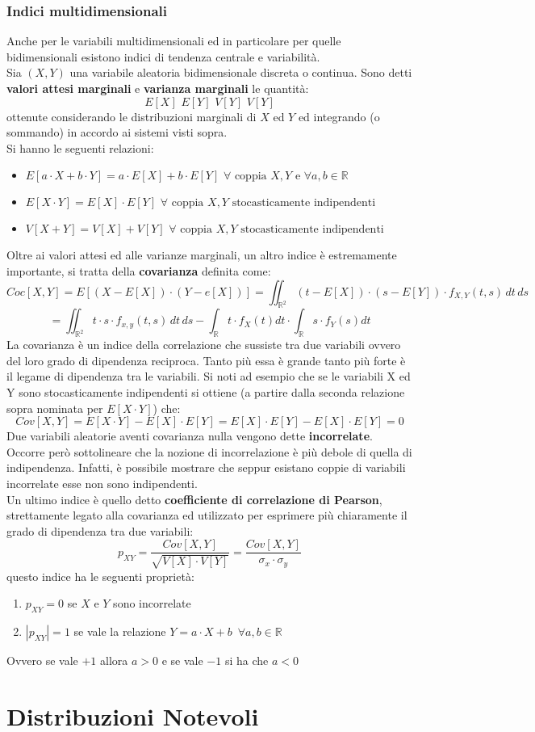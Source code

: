 \documentclass[a4paper,12pt, oneside]{book}
\begin{document}
\subsection{Indici multidimensionali}
Anche per le variabili multidimensionali ed in particolare per quelle bidimensionali esistono indici di tendenza centrale e variabilità.\\
Sia $(X,Y)$ una variabile aleatoria bidimensionale discreta o continua. Sono detti \textbf{valori attesi marginali} e \textbf{varianza marginali }le quantità:
\[E[X]\,\,E[Y]\,\,V[Y]\,\,V[Y]\]
ottenute considerando le distribuzioni marginali di $X$ ed $Y $ ed integrando (o sommando) in accordo ai sistemi visti sopra.\\
Si hanno le seguenti relazioni:
\begin{itemize}
\item $E[a\cdot X +b \cdot Y]=a\cdot E[X] + b\cdot E[Y]\,\,\forall \mbox{ coppia }X,Y \mbox{ e }\forall a,b\in\mathbb{R}$
\item $E[X \cdot Y]= E[X]\cdot E[Y]\,\,\forall \mbox{ coppia }X,Y \mbox{ stocasticamente indipendenti}$
\item $V[X + Y]= V[X]+ V[Y]\,\,\forall \mbox{ coppia }X,Y \mbox{ stocasticamente indipendenti}$
\end{itemize}
Oltre ai valori attesi ed alle varianze marginali, un altro indice è estremamente importante, si tratta della \textbf{covarianza} definita come:
\[Coc[X,Y]=E[(X-E[X])\cdot(Y-e[X])]=\iint_{\mathbb{R}^2} (t-E[X])\cdot (s-E[Y])\cdot f_{X,Y}(t,s)\,dt\,ds\]
\[=\iint_{\mathbb{R}^2} t \cdot s\cdot f_{x,y}(t,s)\,dt\,ds-\int_{\mathbb{R}}t\cdot f_X(t)dt\cdot \int_{\mathbb{R}}s\cdot f_Y(s)dt\]
La covarianza è un indice della correlazione che sussiste tra due variabili ovvero del loro grado di dipendenza reciproca.
Tanto più essa è grande tanto più forte è il legame di dipendenza tra le variabili. Si noti ad esempio che se le variabili X ed Y sono stocasticamente indipendenti si ottiene (a partire dalla seconda relazione sopra nominata per $E[X\cdot Y]$) che:
\[Cov[X,Y]=E[X\cdot Y]-E[X]\cdot E[Y]=E[X]\cdot E[Y]-E[X]\cdot E[Y]=0\]
Due variabili aleatorie aventi covarianza nulla vengono dette \textbf{incorrelate}. Occorre però sottolineare che la nozione di incorrelazione è più debole di quella di
indipendenza. Infatti, è possibile mostrare che seppur esistano coppie di variabili incorrelate esse
non sono indipendenti.\\
Un ultimo indice è quello detto \textbf{coefficiente di correlazione di Pearson}, strettamente legato alla covarianza ed utilizzato per esprimere più chiaramente il grado di dipendenza tra due variabili:
\[p_{XY}=\frac{Cov[X,Y]}{\sqrt{V[X]\cdot V[Y]}}=\frac{Cov[X,Y]}{\sigma_x\cdot \sigma_y}\]
questo indice ha le seguenti proprietà:
\begin{enumerate}
\item $p_{XY}=0$ se $X$ e $Y$ sono incorrelate
\item $|p_{XY}|=1$ se vale la relazione $Y=a\cdot X+b\,\,\,\forall a,b\in \mathbb{R}$
\end{enumerate}
Ovvero se vale $+1$ allora $a>0$ e se vale $-1$ si ha che $a<0$
\chapter{Distribuzioni Notevoli}
\end{document}
